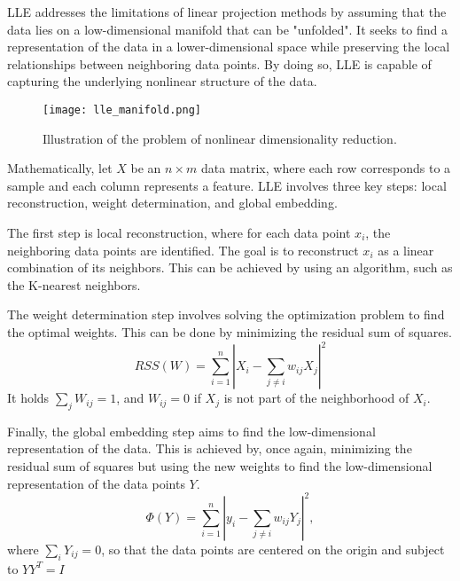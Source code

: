 LLE addresses the limitations of linear projection methods by assuming that the data lies on a low-dimensional manifold that can be "unfolded". It seeks to find a representation of the data in a lower-dimensional space while preserving the local relationships between neighboring data points. By doing so, LLE is capable of capturing the underlying nonlinear structure of the data.

\begin{figure}
    \centering
    \texttt{[image: lle\_manifold.png]}
    \caption{Illustration of the problem of nonlinear dimensionality reduction.}
    \label{fig:lle_manifold}
\end{figure}

Mathematically, let $X$ be an $n \times m$ data matrix, where each row corresponds to a sample and each column represents a feature. LLE involves three key steps: local reconstruction, weight determination, and global embedding.

The first step is local reconstruction, where for each data point $x_i$, the neighboring data points are identified. The goal is to reconstruct $x_i$ as a linear combination of its neighbors. This can be achieved by using an algorithm, such as the K-nearest neighbors.

The weight determination step involves solving the optimization problem to find the optimal weights. This can be done by minimizing the residual sum of squares.
\begin{equation}
    RSS(W) = \sum^n_{i=1} |X_i - \sum_{j \neq i} w_{ij} X_j|^2
\end{equation}
It holds $\sum_j W_{ij} = 1$, and $W_{ij} = 0$ if $X_j$ is not part of the neighborhood of $X_i$.

Finally, the global embedding step aims to find the low-dimensional representation of the data. This is achieved by, once again, minimizing the residual sum of squares but using the new weights to find the low-dimensional representation of the data points $Y$.
\begin{equation}
    \Phi(Y) = \sum^n_{i=1} |y_i - \sum_{j\neq i}w_{ij}Y_j|^2,
\end{equation}
where $\sum_i Y_{ij} = 0$, so that the data points are centered on the origin and subject to $Y Y^T = I$

